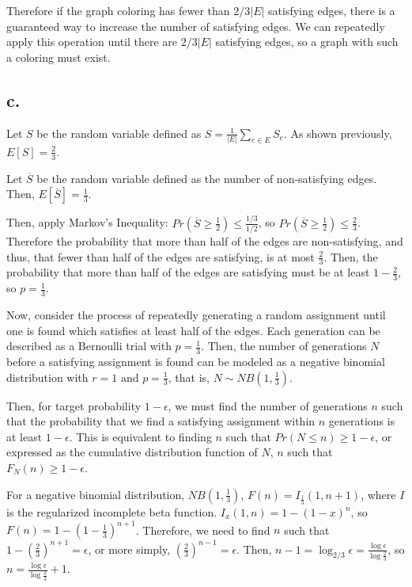 \documentclass[11pt]{article}
\begin{document}
Therefore if the graph coloring has fewer than $2/3|E|$ satisfying edges, there is a guaranteed way to increase the number of satisfying edges. We can repeatedly apply this operation until there are $2/3|E|$ satisfying edges, so a graph with such a coloring must exist.

\subsection{c.}

Let $S$ be the random variable defined as $S = \frac{1}{|E|} \sum_{e \in E} S_e$. As shown previously, $E[S] = \frac{2}{3}$.

Let $\overline{S}$ be the random variable defined as the number of non-satisfying edges. Then, $E[\overline{S}] = \frac{1}{3}$.

Then, apply Markov's Inequality: $Pr( \overline{S} \geq \frac{1}{2} ) \leq \frac{1/3}{1/2}$, so $Pr ( \overline{S} \geq \frac{1}{2} ) \leq \frac{2}{3}$. Therefore the probability that more than half of the edges are non-satisfying, and thus, that fewer than half of the edges are satisfying, is at most $\frac{2}{3}$. Then, the probability that more than half of the edges are satisfying must be at least $1 - \frac{2}{3}$, so $p = \frac{1}{3}$.

Now, consider the process of repeatedly generating a random assignment until one is found which satisfies at least half of the edges. Each generation can be described as a Bernoulli trial with $p = \frac{1}{3}$. Then, the number of generations $N$ before a satisfying assignment is found can be modeled as a negative binomial distribution with $r = 1$ and $p = \frac{1}{3}$, that is, $N \sim NB(1, \frac{1}{3})$. 

Then, for target probability $1 - \epsilon$, we must find the number of generations $n$ such that the probability that we find a satisfying assignment within $n$ generations is at least $1 - \epsilon$. This is equivalent to finding $n$ such that $Pr(N \leq n) \geq 1 - \epsilon$, or expressed as the cumulative distribution function of $N$, $n$ such that $F_N(n) \geq 1 - \epsilon$. 

For a negative binomial distribution, $NB(1, \frac{1}{3})$, $F(n) = I_{\frac{1}{3}}(1, n+1)$, where $I$ is the regularized incomplete beta function. $I_x(1, n) = 1 - (1-x)^n$, so $F(n) = 1 - (1 - \frac{1}{3})^{n+1}$. Therefore, we need to find $n$ such that $1 - (\frac{2}{3})^{n+1} = \epsilon$, or more simply, $(\frac{2}{3})^{n-1} = \epsilon$. Then, $n-1 = \log_{2/3} \epsilon = \frac{\log \epsilon}{\log \frac{2}{3}}$, so $n = \frac{\log \epsilon}{\log \frac{2}{3}} + 1$. 
\end{document}
